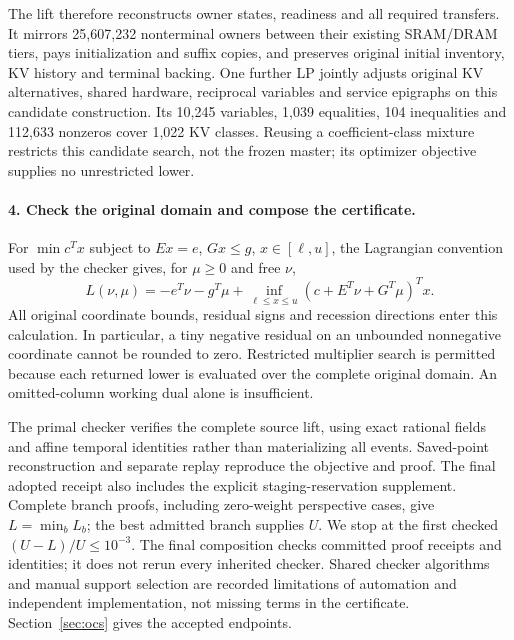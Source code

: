 The lift therefore reconstructs owner states, readiness and all required transfers.
It mirrors 25,607,232 nonterminal owners between their existing SRAM/DRAM tiers, pays initialization and suffix copies, and preserves original initial inventory, KV history and terminal backing.
One further LP jointly adjusts original KV alternatives, shared hardware, reciprocal variables and service epigraphs on this candidate construction.
Its 10,245 variables, 1,039 equalities, 104 inequalities and 112,633 nonzeros cover 1,022 KV classes.
Reusing a coefficient-class mixture restricts this candidate search, not the frozen master; its optimizer objective supplies no unrestricted lower.

\paragraph{4. Check the original domain and compose the certificate.}
For $\min c^Tx$ subject to $Ex=e$, $Gx\le g$, $x\in[\ell,u]$, the Lagrangian convention used by the checker gives, for $\mu\ge0$ and free $\nu$,
\begin{equation}
 L(\nu,\mu)=-e^T\nu-g^T\mu+
   \inf_{\ell\le x\le u}(c+E^T\nu+G^T\mu)^Tx.
 \label{eq:complete_box_bound}
\end{equation}
All original coordinate bounds, residual signs and recession directions enter this calculation.
In particular, a tiny negative residual on an unbounded nonnegative coordinate cannot be rounded to zero.
Restricted multiplier search is permitted because each returned lower is evaluated over the complete original domain.
An omitted-column working dual alone is insufficient.

The primal checker verifies the complete source lift, using exact rational fields and affine temporal identities rather than materializing all events.
Saved-point reconstruction and separate replay reproduce the objective and proof.
The final adopted receipt also includes the explicit staging-reservation supplement.
Complete branch proofs, including zero-weight perspective cases, give $L=\min_b L_b$; the best admitted branch supplies $U$.
We stop at the first checked $(U-L)/U\le10^{-3}$.
The final composition checks committed proof receipts and identities; it does not rerun every inherited checker.
Shared checker algorithms and manual support selection are recorded limitations of automation and independent implementation, not missing terms in the certificate.
Section~\ref{sec:ocs} gives the accepted endpoints.

